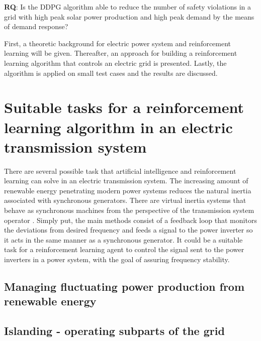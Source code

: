 \documentclass[class=book, crop=false]{standalone}
\begin{document}
\begin{displayquote}
\textbf{RQ}: Is the DDPG algorithm able to reduce the number of safety violations in a grid with high peak solar power production and high peak demand by the means of demand response? 
\end{displayquote}

First, a theoretic background for electric power system and reinforcement learning will be given. Thereafter, an approach for building a reinforcement learning algorithm that controls an electric grid is presented. Lastly, the algorithm is applied on small test cases and the results are discussed.


\section{Suitable tasks for a reinforcement learning algorithm in an electric transmission system}

There are several possible task that artificial intelligence and reinforcement learning can solve in an electric transmission system. The increasing amount of renewable energy penetrating modern power systems reduces the natural inertia associated with synchronous generators. There are virtual inertia systems that behave as synchronous machines from the perspective of the transmission system operator \cite{virtual_inertia}. Simply put, the main methods consist of a feedback loop that monitors the deviations from desired frequency and feeds a signal to the power inverter so it acts in the same manner as a synchronous generator. It could be a suitable task for a reinforcement learning agent to control the signal sent to the power inverters in a power system, with the goal of assuring frequency stability.



\subsection{Managing fluctuating power production from renewable energy}

\subsection{Islanding - operating subparts of the grid}
\end{document}
